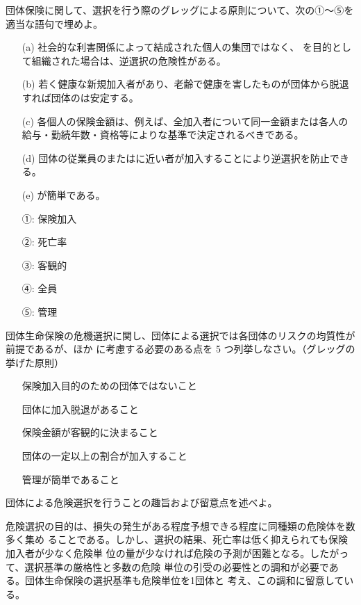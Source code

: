 \documentclass[report,gutter=10mm,fore-edge=10mm,uplatex,dvipdfmx]{jlreq}
\begin{document}
団体保険に関して、選択を行う際のグレッグによる原則について、次の①～⑤を適当な語句で埋めよ。

\begin{itemize}
\item[ (a)]  社会的な利害関係によって結成された個人の集団ではなく、 を目的として組織された場合は、逆選択の危険性がある。
\item[ (b)]  若く健康な新規加入者があり、老齢で健康を害したものが団体から脱退すれば団体のは安定する。
\item[ (c)]  各個人の保険金額は、例えば、全加入者について同一金額または各人の給与・勤続年数・資格等によりな基準で決定されるべきである。
\item[ (d)]  団体の従業員のまたはに近い者が加入することにより逆選択を防止できる。
\item[ (e)]  が簡単である。
\end{itemize}

\answer{}
\begin{itemize}
\item[ ①: ] 保険加入
\item[ ②: ] 死亡率
\item[ ③: ] 客観的
\item[ ④: ] 全員
\item[ ⑤: ] 管理
\end{itemize}

団体生命保険の危機選択に関し、団体による選択では各団体のリスクの均質性が前提であるが、ほか
に考慮する必要のある点を 5 つ列挙しなさい。（グレッグの挙げた原則）
\answer{}
\begin{itemize}
\item[]  保険加入目的のための団体ではないこと
\item[]  団体に加入脱退があること
\item[]  保険金額が客観的に決まること
\item[]  団体の一定以上の割合が加入すること
\item[]  管理が簡単であること
\end{itemize}

団体による危険選択を行うことの趣旨および留意点を述べよ。
\answer{}

危険選択の目的は、損失の発生がある程度予想できる程度に同種類の危険体を数多く集め
ることである。しかし、選択の結果、死亡率は低く抑えられても保険加入者が少なく危険単
位の量が少なければ危険の予測が困難となる。したがって、選択基準の厳格性と多数の危険
単位の引受の必要性との調和が必要である。団体生命保険の選択基準も危険単位を1団体と
考え、この調和に留意している。
\end{document}
